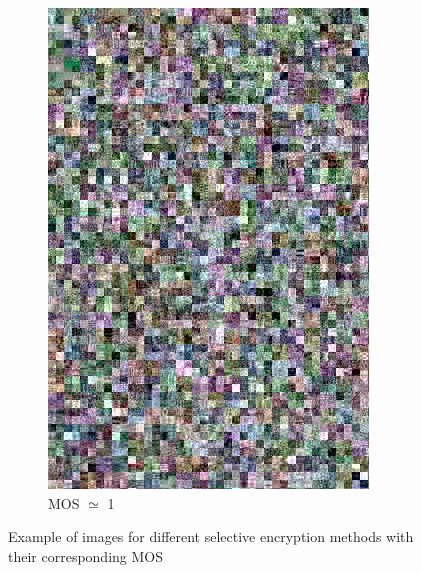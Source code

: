 \documentclass{article}
\begin{document}
\begin{figure}[ht]
\begin{subfigure}{2.9cm}
  \includegraphics[width=0.9\linewidth]{figures/ac_dc_shuffle_xor_chrominance_luminance_76_274007}
  \caption{MOS $\simeq$ 1}
  \label{fig:sub2}
\end{subfigure}

\caption{Example of images for different selective encryption methods with their corresponding MOS}
\label{fig:images}
\end{figure}

\end{document}
